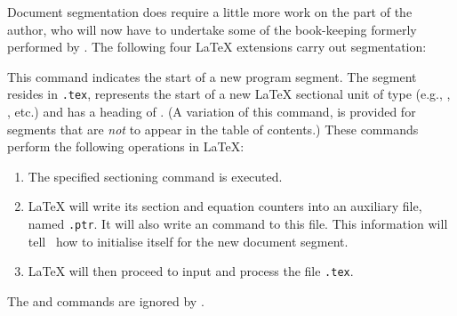 \begin{changebar}
\html{\\}\noindent
Document segmentation does require a little more work on the
part of the author, who will now have to undertake some
of the book-keeping formerly performed by \latextohtml.
The following four \LaTeX{} extensions carry out segmentation:

\begin{htmllist}%
%
%
\item [ \Lc{segment\char123}\Meta{file}\texttt{\char125\char123}\Meta{sec-type}%
 \texttt{\char125\char123}\Meta{heading}\texttt{\char125}\label{segment}]
%
This command indicates the start of a new program segment.
The segment resides in \texttt{.tex}, represents the start
of a new \LaTeX{} sectional unit of type 
(e.g., , , etc.) and has a heading
of .  (A variation  of this command, 
is provided for segments that are \emph{not} to appear in the table of contents.)\html{\\}  
These commands perform the following operations in \LaTeX:
%
\begin{enumerate}
\item 
The specified sectioning command is executed.
\item 
\LaTeX{} will write its section and equation counters
into an auxiliary file, named \texttt{.ptr}.  It will also
write an  command to this file.  This
information will tell \latextohtml\ how to initialise itself
for the new document segment.
\item 
\LaTeX{} will then proceed to input and process the file \texttt{.tex}.
\end{enumerate}
The  and  commands are ignored by
\latextohtml.


\end{htmllist}
\end{changebar}
